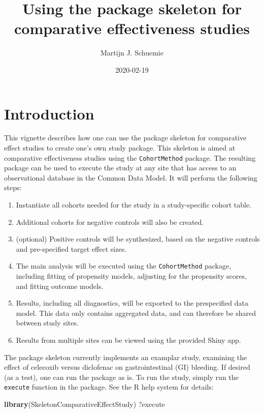 \documentclass[
]{article}
\title{Using the package skeleton for comparative effectiveness studies}
\author{Martijn J. Schuemie}
\date{2020-02-19}
\newenvironment{Shaded}{\begin{snugshade}}{\end{snugshade}}
\newcommand{\KeywordTok}[1]{\textcolor[rgb]{0.13,0.29,0.53}{\textbf{#1}}}
\newcommand{\NormalTok}[1]{#1}
\providecommand{\tightlist}{%
  \setlength{\itemsep}{0pt}\setlength{\parskip}{0pt}}
\begin{document}
\maketitle

{
\setcounter{tocdepth}{2}
\tableofcontents
}
\hypertarget{introduction}{%
\section{Introduction}\label{introduction}}

This vignette describes how one can use the package skeleton for
comparative effect studies to create one's own study package. This
skeleton is aimed at comparative effectiveness studies using the
\texttt{CohortMethod} package. The resulting package can be used to
execute the study at any site that has access to an observational
database in the Common Data Model. It will perform the following steps:

\begin{enumerate}
\def\labelenumi{\arabic{enumi}.}
\tightlist
\item
  Instantiate all cohorts needed for the study in a study-specific
  cohort table.
\item
  Additional cohorts for negative controls will also be created.
\item
  (optional) Positive controls will be synthesized, based on the
  negative controls and pre-specified target effect sizes.
\item
  The main analysis will be executed using the \texttt{CohortMethod}
  package, including fitting of propensity models, adjusting for the
  propensity scores, and fitting outcome models.
\item
  Results, including all diagnostics, will be exported to the
  prespecified data model. This data only contains aggregated data, and
  can therefore be shared between study sites.
\item
  Results from multiple sites can be viewed using the provided Shiny
  app.
\end{enumerate}

The package skeleton currently implements an examplar study, examining
the effect of celecoxib versus diclofenac on gastrointestinal (GI)
bleeding. If desired (as a test), one can run the package as is. To run
the study, simply run the \texttt{execute} function in the package. See
the R help system for details:

\begin{Shaded}
\begin{Highlighting}[]
\KeywordTok{library}\NormalTok{(SkeletonComparativeEffectStudy)}
\NormalTok{?execute}
\end{Highlighting}
\end{Shaded}
\end{document}
